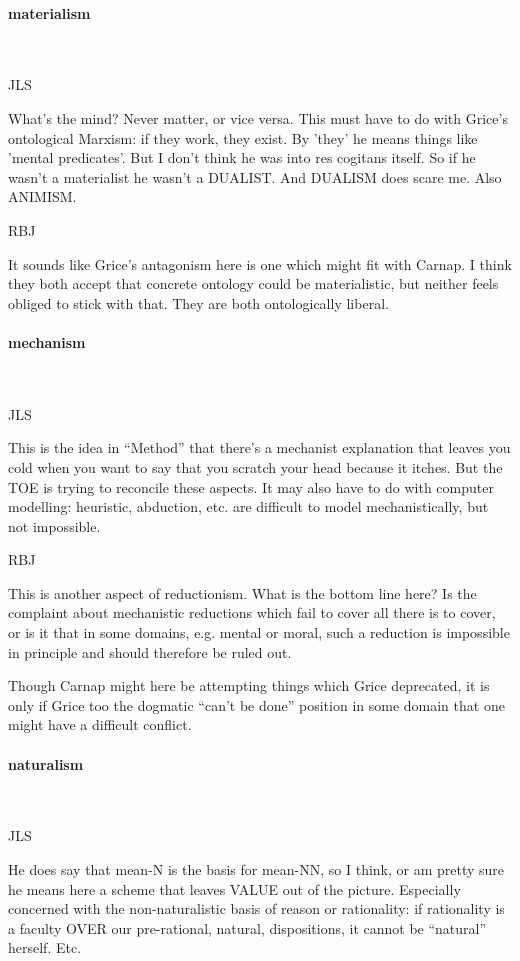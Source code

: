 \documentclass[10pt,titlepage]{book}
\begin{document}
\paragraph{materialism}\ 

JLS

What's the mind? Never matter, or vice versa. This must have  
to do with Grice's ontological Marxism: if they work, they exist. By 'they' 
he  means things like 'mental predicates'. But I don't think he was into res 
 cogitans itself. So if he wasn't a materialist he wasn't a DUALIST. And 
DUALISM  does scare me. Also ANIMISM.

RBJ

It sounds like Grice's antagonism here is one which might fit with Carnap.
I think they both accept that concrete ontology could be materialistic, but neither feels obliged to stick with that.
They are both ontologically liberal.
 
\paragraph{mechanism}\ 

JLS

This is the idea in ``Method'' that there's a mechanist  
explanation that leaves you cold when you want to say that you scratch your head  
because it itches. But the TOE is trying to reconcile these aspects. It may 
also  have to do with computer modelling: heuristic, abduction, etc. are 
difficult to  model mechanistically, but not impossible.
 
RBJ

This is another aspect of reductionism.
What is the bottom line here?
Is the complaint about mechanistic reductions which fail to cover all there is to cover, or is it that in some domains, e.g. mental or moral, such a reduction is impossible in principle and should therefore be ruled out.

Though Carnap might here be attempting things which Grice deprecated, it is only if Grice too the dogmatic ``can't be done'' position in some domain that one might have a difficult conflict.
 
\paragraph{naturalism}\ 

JLS

He does say that mean-N is the basis for mean-NN, so I think,  
or am pretty sure he means here a scheme that leaves VALUE out of the 
picture.  Especially concerned with the non-naturalistic basis of reason or 
rationality:  if rationality is a faculty OVER our pre-rational, natural, 
dispositions, it  cannot be ``natural'' herself. Etc. 
\end{document}
